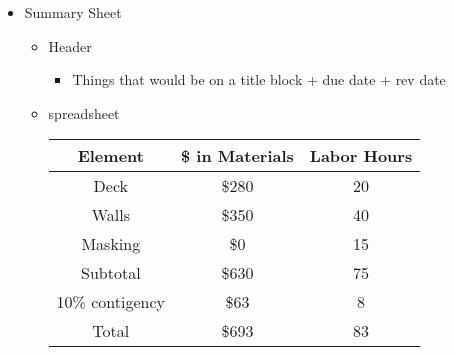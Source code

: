 \documentclass[12pt]{article}
\begin{document}
\begin{itemize}
                \item Summary Sheet
                \begin{itemize}
                    \item Header
                    \begin{itemize}
                        \item Things that would be on a title block + due date + rev date
                    \end{itemize}
                    \item spreadsheet
                    \begin{center}
                        \begin{tabular}{c|c|c}
                            Element & \$ in Materials & Labor Hours \\
                            \hline
                            \hline
                            Deck & \$280 & 20 \\
                            Walls & \$350 & 40 \\
                            Masking & \$0 & 15 \\
                            \hline
                            Subtotal & \$630 & 75 \\
                            \cline{2-3}
                            10\% contigency & \$63 & 8 \\
                            \hline
                            \hline
                            Total & \$693 & 83 
                        \end{tabular}
                    \end{center}
                \end{itemize}
            \end{itemize}
\end{document}
